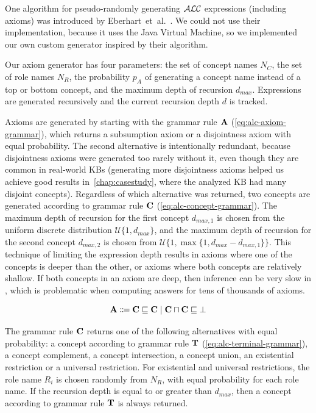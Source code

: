 One algorithm for pseudo-randomly generating $\mathcal{ALC}$ expressions (including axioms) was introduced by Eberhart~et~al.~\cite{eberhart_pseudo-random_2018}.
We could not use their implementation, because it uses the Java Virtual Machine, so we implemented our own custom generator inspired by their algorithm.

Our axiom generator has four parameters: the set of concept names $N_C$, the set of role names $N_R$, the probability $p_A$ of generating a concept name instead of a top or bottom concept, and the maximum depth of recursion $d_{max}$.
Expressions are generated recursively and the current recursion depth $d$ is tracked.

Axioms are generated by starting with the grammar rule $\mathbf{A}$ (\autoref{eq:alc-axiom-grammar}), which returns a subsumption axiom or a disjointness axiom with equal probability.
The second alternative is intentionally redundant, because disjointness axioms were generated too rarely without it, even though they are common in real-world KBs (generating more disjointness axioms helped us achieve good results in~\autoref{chap:casestudy}, where the analyzed KB had many disjoint concepts).
Regardless of which alternative was returned, two concepts are generated according to grammar rule $\mathbf{C}$ (\autoref{eq:alc-concept-grammar}).
The maximum depth of recursion for the first concept $d_{max,1}$ is chosen from the uniform discrete distribution $\mathcal{U}\{1, d_{max}\}$, and the maximum depth of recursion for the second concept $d_{max,2}$ is chosen from $\mathcal{U}\{1, \max\{1, d_{max} - d_{max,1} \} \}$.
This technique of limiting the expression depth results in axioms where one of the concepts is deeper than the other, or axioms where both concepts are relatively shallow.
If both concepts in an axiom are deep, then inference can be very slow in \factpp{}, which is problematic when computing answers for tens of thousands of axioms.

\begin{equation}
\label{eq:alc-axiom-grammar}
\mathbf{A} \Coloneqq \mathbf{C} \sqsubseteq \mathbf{C} \mid \mathbf{C} \sqcap \mathbf{C} \sqsubseteq \bot
\end{equation}

The grammar rule $\mathbf{C}$ returns one of the following alternatives with equal probability: a concept according to grammar rule $\mathbf{T}$ (\autoref{eq:alc-terminal-grammar}), a concept complement, a concept intersection, a concept union, an existential restriction or a universal restriction.
For existential and universal restrictions, the role name $R_i$ is chosen randomly from $N_R$, with equal probability for each role name.
If the recursion depth is equal to or greater than $d_{max}$, then a concept according to grammar rule $\mathbf{T}$ is always returned.

